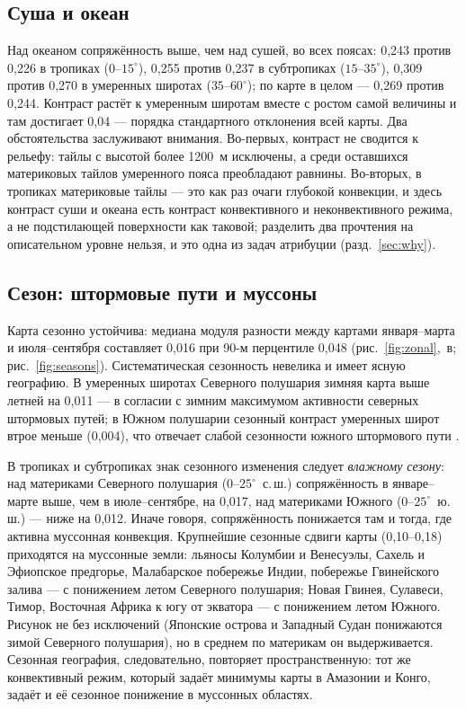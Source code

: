 \documentclass[11pt,a4paper]{article}
\begin{document}
\subsection{Суша и океан}

Над океаном сопряжённость выше, чем над сушей, во всех поясах: 0,243 против 0,226 в тропиках ($0$--$15^\circ$), 0,255 против 0,237 в субтропиках ($15$--$35^\circ$), 0,309 против 0,270 в умеренных широтах ($35$--$60^\circ$); по карте в целом --- 0,269 против 0,244. Контраст растёт к умеренным широтам вместе с ростом самой величины и там достигает 0,04 --- порядка стандартного отклонения всей карты. Два обстоятельства заслуживают внимания. Во-первых, контраст не сводится к рельефу: тайлы с высотой более 1200~м исключены, а среди оставшихся материковых тайлов умеренного пояса преобладают равнины. Во-вторых, в тропиках материковые тайлы --- это как раз очаги глубокой конвекции, и здесь контраст суши и океана есть контраст конвективного и неконвективного режима, а не подстилающей поверхности как таковой; разделить два прочтения на описательном уровне нельзя, и это одна из задач атрибуции (разд.~\ref{sec:why}).

\subsection{Сезон: штормовые пути и муссоны}

Карта сезонно устойчива: медиана модуля разности между картами января--марта и июля--сентября составляет 0,016 при 90-м перцентиле 0,048 (рис.~\ref{fig:zonal},~в; рис.~\ref{fig:seasons}). Систематическая сезонность невелика и имеет ясную географию. В умеренных широтах Северного полушария зимняя карта выше летней на 0,011 --- в согласии с зимним максимумом активности северных штормовых путей; в Южном полушарии сезонный контраст умеренных широт втрое меньше (0,004), что отвечает слабой сезонности южного штормового пути \cite{Trenberth1991}.

В тропиках и субтропиках знак сезонного изменения следует \emph{влажному сезону}: над материками Северного полушария ($0$--$25^\circ$~с.\,ш.) сопряжённость в январе--марте выше, чем в июле--сентябре, на 0,017, над материками Южного ($0$--$25^\circ$~ю.\,ш.) --- ниже на 0,012. Иначе говоря, сопряжённость понижается там и тогда, где активна муссонная конвекция. Крупнейшие сезонные сдвиги карты (0,10--0,18) приходятся на муссонные земли: льяносы Колумбии и Венесуэлы, Сахель и Эфиопское предгорье, Малабарское побережье Индии, побережье Гвинейского залива --- с понижением летом Северного полушария; Новая Гвинея, Сулавеси, Тимор, Восточная Африка к югу от экватора --- с понижением летом Южного. Рисунок не без исключений (Японские острова и Западный Судан понижаются зимой Северного полушария), но в среднем по материкам он выдерживается. Сезонная география, следовательно, повторяет пространственную: тот же конвективный режим, который задаёт минимумы карты в Амазонии и Конго, задаёт и её сезонное понижение в муссонных областях.
\end{document}
